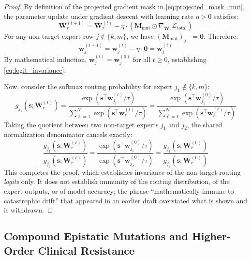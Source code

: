 \documentclass{article}
\theoremstyle{definition}
\begin{document}
\begin{proof}
By definition of the projected gradient mask in \cref{eq:projected_mask_mut}, the parameter update under gradient descent with learning rate $\eta > 0$ satisfies:
\begin{equation}
\mathbf{W}_r^{(t+1)} = \mathbf{W}_r^{(t)} - \eta \cdot \left( \mathbf{M}_{\mathrm{mut}} \odot \nabla_{\mathbf{W}_r} \mathcal{L}_{\mathrm{total}} \right)
\end{equation}
For any non-target expert row $j \notin \{k, m\}$, we have $(\mathbf{M}_{\mathrm{mut}})_{j,:} = \mathbf{0}$. Therefore:
\begin{equation}
\mathbf{w}_j^{(t+1)} = \mathbf{w}_j^{(t)} - \eta \cdot \mathbf{0} = \mathbf{w}_j^{(t)}
\end{equation}
By mathematical induction, $\mathbf{w}_j^{(t)} = \mathbf{w}_j^{(0)}$ for all $t \ge 0$, establishing \cref{eq:logit_invariance}. 

Now, consider the softmax routing probability for expert $j_1 \notin \{k, m\}$:
\begin{equation}
g_{j_1}(\mathbf{s}; \mathbf{W}_r^{(t)}) = \frac{\exp\left(\mathbf{s}^\top \mathbf{w}_{j_1}^{(t)} / \tau\right)}{\sum_{\ell=1}^N \exp\left(\mathbf{s}^\top \mathbf{w}_\ell^{(t)} / \tau\right)} = \frac{\exp\left(\mathbf{s}^\top \mathbf{w}_{j_1}^{(0)} / \tau\right)}{\sum_{\ell=1}^N \exp\left(\mathbf{s}^\top \mathbf{w}_\ell^{(t)} / \tau\right)}
\end{equation}
Taking the quotient between two non-target experts $j_1$ and $j_2$, the shared normalization denominator cancels exactly:
\begin{equation}
\frac{g_{j_1}(\mathbf{s}; \mathbf{W}_r^{(t)})}{g_{j_2}(\mathbf{s}; \mathbf{W}_r^{(t)})} = \frac{\exp\left(\mathbf{s}^\top \mathbf{w}_{j_1}^{(0)} / \tau\right)}{\exp\left(\mathbf{s}^\top \mathbf{w}_{j_2}^{(0)} / \tau\right)} = \frac{g_{j_1}(\mathbf{s}; \mathbf{W}_r^{(0)})}{g_{j_2}(\mathbf{s}; \mathbf{W}_r^{(0)})}
\end{equation}
This completes the proof, which establishes invariance of the non-target routing \emph{logits} only. It does not establish immunity of the routing distribution, of the expert outputs, or of model accuracy; the phrase ``mathematically immune to catastrophic drift'' that appeared in an earlier draft overstated what is shown and is withdrawn.
\end{proof}

\subsection{Compound Epistatic Mutations and Higher-Order Clinical Resistance}
\label{subsec:compound_epistasis}
\end{document}

